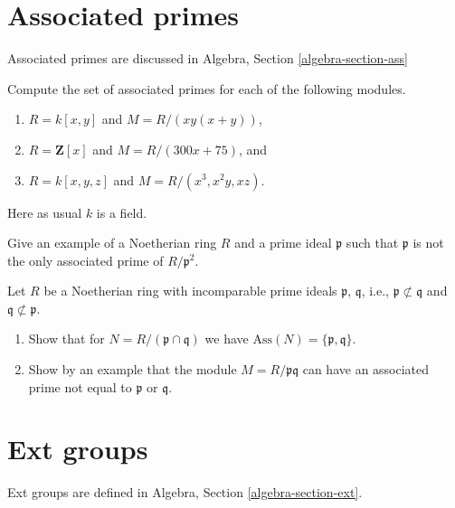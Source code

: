 \section{Associated primes}
\label{section-ass}

\noindent
Associated primes are discussed in
Algebra, Section \ref{algebra-section-ass}

\begin{exercise}
\label{exercise-compute-ass}
Compute the set of associated primes for each of the following modules.
\begin{enumerate}
\item $R = k[x, y]$ and $M = R/(xy(x + y))$,
\item $R = \mathbf{Z}[x]$ and $M = R/(300x + 75)$, and
\item $R = k[x, y, z]$ and $M = R/(x^3, x^2y, xz)$.
\end{enumerate}
Here as usual $k$ is a field.
\end{exercise}

\begin{exercise}
\label{exercise-prime-power-not-primary}
Give an example of a Noetherian ring $R$ and a prime ideal $\mathfrak p$
such that $\mathfrak p$ is not the only associated prime of $R/\mathfrak p^2$.
\end{exercise}

\begin{exercise}
\label{exercise-product-primes-not-only-associated}
Let $R$ be a Noetherian ring with incomparable prime ideals
$\mathfrak p$, $\mathfrak q$, i.e., $\mathfrak p \not \subset \mathfrak q$
and $\mathfrak q \not \subset \mathfrak p$.
\begin{enumerate}
\item Show that for $N = R/(\mathfrak p \cap \mathfrak q)$
we have $\text{Ass}(N) = \{\mathfrak p, \mathfrak q\}$.
\item Show by an example that the module
$M = R/\mathfrak p \mathfrak q$ can
have an associated prime not equal to $\mathfrak p$ or $\mathfrak q$.
\end{enumerate}
\end{exercise}





\section{Ext groups}
\label{section-ext}

\noindent
Ext groups are defined in Algebra, Section \ref{algebra-section-ext}.


